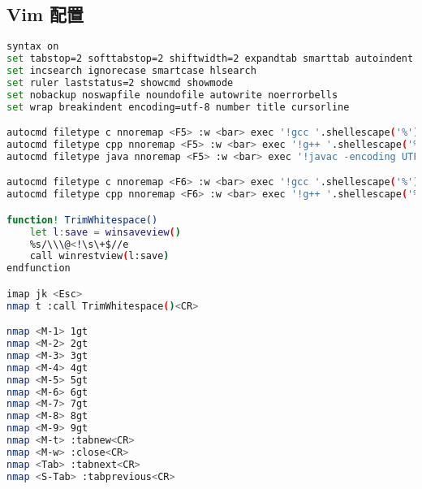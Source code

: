 \subsection{Vim 配置}
\begin{lstlisting}[language=sh]
syntax on
set tabstop=2 softtabstop=2 shiftwidth=2 expandtab smarttab autoindent
set incsearch ignorecase smartcase hlsearch
set ruler laststatus=2 showcmd showmode
set nobackup noswapfile noundofile autowrite noerrorbells
set wrap breakindent encoding=utf-8 number title cursorline

autocmd filetype c nnoremap <F5> :w <bar> exec '!gcc '.shellescape('%').' -o '.shellescape('%:r').' -std=c11 -Wall && ./'.shellescape('%:r')<CR>
autocmd filetype cpp nnoremap <F5> :w <bar> exec '!g++ '.shellescape('%').' -o '.shellescape('%:r').' -std=c++17 -Wall && ./'.shellescape('%:r')<CR>
autocmd filetype java nnoremap <F5> :w <bar> exec '!javac -encoding UTF-8 -sourcepath . -d . '.shellescape('%').' && java '.shellescape('%:r')<CR>

autocmd filetype c nnoremap <F6> :w <bar> exec '!gcc '.shellescape('%').' -o '.shellescape('%:r').' -std=c11 -Wall -g && gdb '.shellescape('%:r')<CR>
autocmd filetype cpp nnoremap <F6> :w <bar> exec '!g++ '.shellescape('%').' -o '.shellescape('%:r').' -std=c++17 -Wall -g && gdb '.shellescape('%:r')<CR>

function! TrimWhitespace()
    let l:save = winsaveview()
    %s/\\\@<!\s\+$//e
    call winrestview(l:save)
endfunction

imap jk <Esc>
nmap t :call TrimWhitespace()<CR>

nmap <M-1> 1gt
nmap <M-2> 2gt
nmap <M-3> 3gt
nmap <M-4> 4gt
nmap <M-5> 5gt
nmap <M-6> 6gt
nmap <M-7> 7gt
nmap <M-8> 8gt
nmap <M-9> 9gt
nmap <M-t> :tabnew<CR>
nmap <M-w> :close<CR>
nmap <Tab> :tabnext<CR>
nmap <S-Tab> :tabprevious<CR>
\end{lstlisting}

